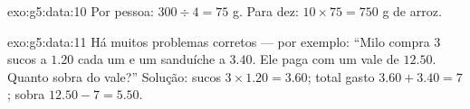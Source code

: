 \begin{solution}{exo:g5:data:10}
Por pessoa: $300 \div 4 = 75$ g. Para dez:
$10 \times 75 = 750$ g de arroz.
\end{solution}

\begin{solution}{exo:g5:data:11}
Há muitos problemas corretos --- por exemplo: ``Milo compra $3$ sucos
a $1.20$ cada um e um sanduíche a $3.40$. Ele paga com um vale de
$12.50$. Quanto sobra do vale?'' Solução: sucos
$3 \times 1.20 = 3.60$; total gasto $3.60 + 3.40 = 7$; sobra
$12.50 - 7 = 5.50$.
\end{solution}
